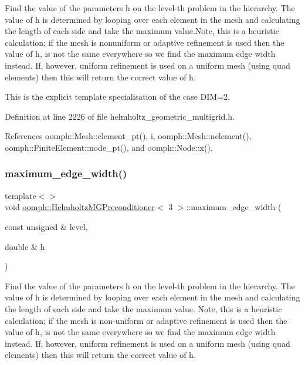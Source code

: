 Find the value of the parameters h on the level-\/th problem in the hierarchy. The value of h is determined by looping over each element in the mesh and calculating the length of each side and take the maximum value.\+Note, this is a heuristic calculation; if the mesh is nonuniform or adaptive refinement is used then the value of h, is not the same everywhere so we find the maximum edge width instead. If, however, uniform refinement is used on a uniform mesh (using quad elements) then this will return the correct value of h. 

This is the explicit template specialisation of the case D\+IM=2. 

Definition at line 2226 of file helmholtz\+\_\+geometric\+\_\+multigrid.\+h.



References oomph\+::\+Mesh\+::element\+\_\+pt(), i, oomph\+::\+Mesh\+::nelement(), oomph\+::\+Finite\+Element\+::node\+\_\+pt(), and oomph\+::\+Node\+::x().

\mbox{\label{classoomph_1_1HelmholtzMGPreconditioner_a3c0766a4b1fa277a41c5ddc5a7391dd2}} 
\subsubsection{\texorpdfstring{maximum\+\_\+edge\+\_\+width()}{maximum\_edge\_width()}\hspace{0.1cm}{\footnotesize\ttfamily [3/3]}}
{\footnotesize\ttfamily template$<$$>$ \\
void \hyperlink{classoomph_1_1HelmholtzMGPreconditioner}{oomph\+::\+Helmholtz\+M\+G\+Preconditioner}$<$ 3 $>$\+::maximum\+\_\+edge\+\_\+width (\begin{DoxyParamCaption}\item[{const unsigned \&}]{level,  }\item[{double \&}]{h }\end{DoxyParamCaption})\hspace{0.3cm}{\ttfamily [private]}}



Find the value of the parameters h on the level-\/th problem in the hierarchy. The value of h is determined by looping over each element in the mesh and calculating the length of each side and take the maximum value. Note, this is a heuristic calculation; if the mesh is non-\/uniform or adaptive refinement is used then the value of h, is not the same everywhere so we find the maximum edge width instead. If, however, uniform refinement is used on a uniform mesh (using quad elements) then this will return the correct value of h. 

